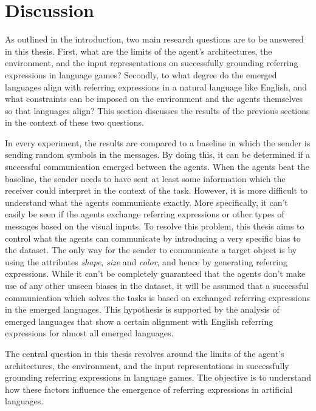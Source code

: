 \section{Discussion}
\label{sec:discussion}

As outlined in the introduction, two main research questions are to be answered in this thesis.
First, what are the limits of the agent's architectures, the environment, and the input representations on successfully grounding referring expressions in language games?
Secondly, to what degree do the emerged languages align with referring expressions in a natural language like English, and what constraints can be imposed on the environment and the agents themselves so that languages align?
This section discusses the results of the previous sections in the context of these two questions.

In every experiment, the results are compared to a baseline in which the sender is sending random symbols in the messages.
By doing this, it can be determined if a successful communication emerged between the agents.
When the agents beat the baseline, the sender needs to have sent at least some information which the receiver could interpret in the context of the task.
However, it is more difficult to understand what the agents communicate exactly.
More specifically, it can't easily be seen if the agents exchange referring expressions or other types of messages based on the visual inputs.
To resolve this problem, this thesis aims to control what the agents can communicate by introducing a very specific bias to the dataset.
The only way for the sender to communicate a target object is by using the attributes \emph{shape}, \emph{size} and \emph{color}, and hence by generating referring expressions.
While it can't be completely guaranteed that the agents don't make use of any other unseen biases in the dataset, it will be assumed that a successful communication which solves the tasks is based on exchanged referring expressions in the emerged languages.
This hypothesis is supported by the analysis of emerged languages that show a certain alignment with English referring expressions for almost all emerged languages.

The central question in this thesis revolves around the limits of the agent's architectures, the environment, and the input representations in successfully grounding referring expressions in language games. The objective is to understand how these factors influence the emergence of referring expressions in artificial languages.

